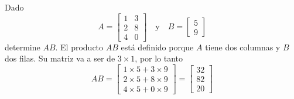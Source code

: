 \begin{ejemplo}
    Dado 
    \[
    A = \begin{bmatrix}
        1 & 3 \\
        2 & 8 \\ 
        4 & 0
    \end{bmatrix}
    \quad
    \text{y}
    \quad
    B = \begin{bmatrix}
        5 \\
        9
    \end{bmatrix}    
    \]
    determine \(AB\). El producto \(AB\) está definido porque \(A\) tiene dos columnas y \(B\) dos filas. Su matriz va a ser de \(3 \times 1\), por lo tanto
    \[
    AB = \begin{bmatrix}
        1 \times 5 + 3 \times 9 \\
        2 \times 5 + 8 \times 9 \\
        4 \times 5 + 0 \times 9 
    \end{bmatrix}
    =
    \begin{bmatrix}
        32 \\
        82 \\
        20
    \end{bmatrix}
    \]
\end{ejemplo}

